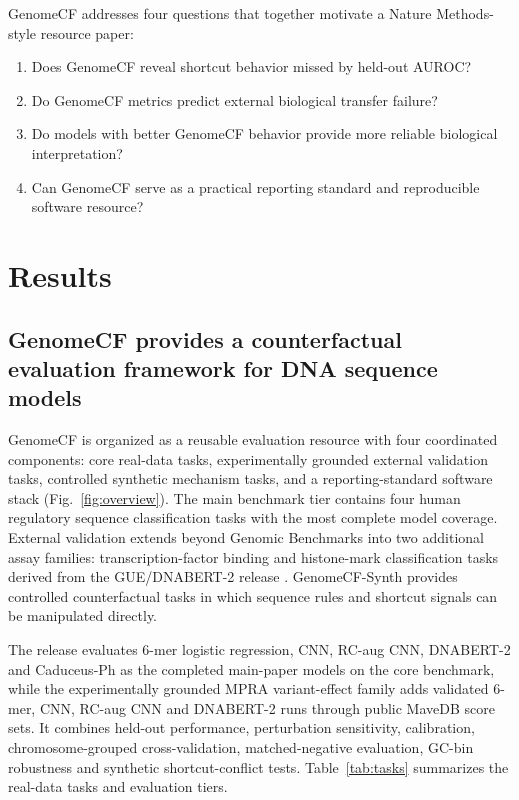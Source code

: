 \documentclass[11pt]{article}
\begin{document}
GenomeCF addresses four questions that together motivate a Nature Methods-style resource paper:
\begin{enumerate}[leftmargin=1.35em]
  \item Does GenomeCF reveal shortcut behavior missed by held-out AUROC?
  \item Do GenomeCF metrics predict external biological transfer failure?
  \item Do models with better GenomeCF behavior provide more reliable biological interpretation?
  \item Can GenomeCF serve as a practical reporting standard and reproducible software resource?
\end{enumerate}

\section{Results}

\subsection{GenomeCF provides a counterfactual evaluation framework for DNA sequence models}
GenomeCF is organized as a reusable evaluation resource with four coordinated components: core real-data tasks, experimentally grounded external validation tasks, controlled synthetic mechanism tasks, and a reporting-standard software stack (Fig.~\ref{fig:overview}). The main benchmark tier contains four human regulatory sequence classification tasks with the most complete model coverage. External validation extends beyond Genomic Benchmarks into two additional assay families: transcription-factor binding and histone-mark classification tasks derived from the GUE/DNABERT-2 release \citep{zhou2024dnabert2}. GenomeCF-Synth provides controlled counterfactual tasks in which sequence rules and shortcut signals can be manipulated directly.

The release evaluates 6-mer logistic regression, CNN, RC-aug CNN, DNABERT-2 and Caduceus-Ph as the completed main-paper models on the core benchmark, while the experimentally grounded MPRA variant-effect family adds validated 6-mer, CNN, RC-aug CNN and DNABERT-2 runs through public MaveDB score sets. It combines held-out performance, perturbation sensitivity, calibration, chromosome-grouped cross-validation, matched-negative evaluation, GC-bin robustness and synthetic shortcut-conflict tests. Table~\ref{tab:tasks} summarizes the real-data tasks and evaluation tiers.
\end{document}
